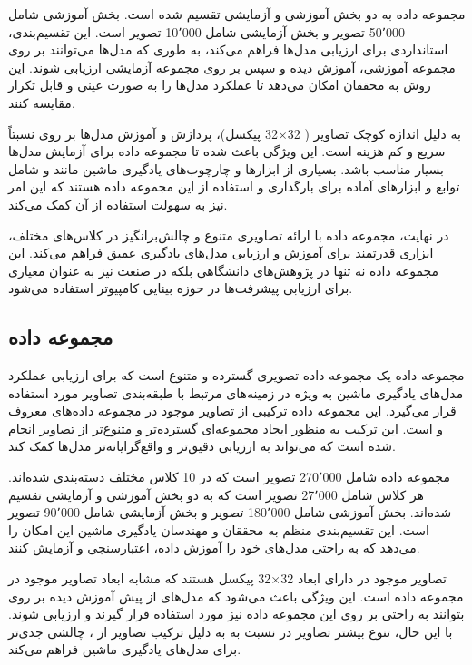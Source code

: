 مجموعه داده
به دو بخش آموزشی و آزمایشی تقسیم شده است. بخش آموزشی شامل 50٬000 تصویر و بخش آزمایشی شامل 10٬000 تصویر است. این تقسیم‌بندی، استانداردی برای ارزیابی مدل‌ها فراهم می‌کند، به طوری که مدل‌ها می‌توانند بر روی مجموعه آموزشی، آموزش دیده و سپس بر روی مجموعه آزمایشی ارزیابی شوند. این روش به محققان امکان می‌دهد تا عملکرد مدل‌ها را به صورت عینی و قابل تکرار مقایسه کنند.

به دلیل اندازه کوچک تصاویر (%
32$\times$32
پیکسل)، پردازش و آموزش مدل‌ها بر روی
نسبتاً سریع و کم هزینه است. این ویژگی باعث شده تا مجموعه داده 
برای آزمایش مدل‌ها بسیار مناسب باشد. بسیاری از ابزارها و چارچوب‌های%
یادگیری ماشین مانند
و
شامل توابع و ابزارهای آماده برای بارگذاری و استفاده از این مجموعه داده هستند که این امر نیز به سهولت استفاده از آن کمک می‌کند.

در نهایت، مجموعه داده
با ارائه تصاویری متنوع و چالش‌برانگیز در کلاس‌های مختلف، ابزاری قدرتمند برای آموزش و ارزیابی مدل‌های یادگیری عمیق فراهم می‌کند. این مجموعه داده نه تنها در پژوهش‌های دانشگاهی بلکه در صنعت نیز به عنوان معیاری برای ارزیابی پیشرفت‌ها در حوزه بینایی کامپیوتر استفاده می‌شود.


\subsection{
	مجموعه داده
}
مجموعه داده
یک مجموعه داده تصویری گسترده و متنوع است که برای ارزیابی عملکرد مدل‌های یادگیری ماشین به ویژه در زمینه‌های مرتبط با طبقه‌بندی تصاویر مورد استفاده قرار می‌گیرد. این مجموعه داده ترکیبی از تصاویر موجود در مجموعه‌ داده‌های معروف
و
است. این ترکیب به منظور ایجاد مجموعه‌ای گسترده‌تر و متنوع‌تر از تصاویر انجام شده است که می‌تواند به ارزیابی دقیق‌تر و واقع‌گرایانه‌تر مدل‌ها کمک کند.

مجموعه داده
شامل 270٬000 تصویر است که در 10 کلاس مختلف دسته‌بندی شده‌اند. هر کلاس شامل 27٬000 تصویر است که به دو بخش آموزشی و آزمایشی تقسیم شده‌اند. بخش آموزشی شامل 180٬000 تصویر و بخش آزمایشی شامل 90٬000 تصویر است. این تقسیم‌بندی منظم به محققان و مهندسان یادگیری ماشین این امکان را می‌دهد که به راحتی مدل‌های خود را آموزش داده، اعتبارسنجی و آزمایش کنند.

تصاویر موجود در
دارای ابعاد
32$\times$32
پیکسل هستند که مشابه ابعاد تصاویر موجود در مجموعه داده
است. این ویژگی باعث می‌شود که مدل‌های از پیش آموزش دیده بر روی
بتوانند به راحتی بر روی این مجموعه داده نیز مورد استفاده قرار گیرند و ارزیابی شوند. با این حال، تنوع بیشتر تصاویر در
نسبت به
به دلیل ترکیب تصاویر از
،
چالشی جدی‌تر برای مدل‌های یادگیری ماشین فراهم می‌کند.


